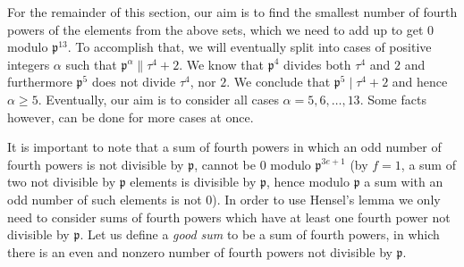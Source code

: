 \documentclass[12pt]{article}
\theoremstyle{remark}
\begin{document}
For the remainder of this section, our aim is to find the smallest number of fourth powers of the elements from the above sets, which we need to add up to get 0 modulo $\mathfrak{p}^{13}$. To accomplish that, we will eventually split into cases of positive integers $\alpha$ such that $\mathfrak{p}^{\alpha} \parallel \tau^4+2$. We know that $\mathfrak{p}^{4}$ divides both $\tau^4$ and $2$ and furthermore $\mathfrak{p}^{5}$ does not divide $\tau^4$, nor $2$. We conclude that $\mathfrak{p}^{5} \mid \tau^4 +2$ and hence $\alpha \geq 5$. Eventually, our aim is to consider all cases $\alpha =5,6,\dots, 13$. Some facts however, can be done for more cases at once.

It is important to note that a sum of fourth powers in which an odd number of fourth powers is not divisible by $\mathfrak{p}$, cannot be 0 modulo $\mathfrak{p}^{3e+1}$ (by $f=1$, a sum of two not divisible by $\mathfrak{p}$ elements is divisible by $\mathfrak{p}$, hence modulo $\mathfrak{p}$ a sum with an odd number of such elements is not 0). In order to use Hensel's lemma we only need to consider sums of fourth powers which have at least one fourth power not divisible by $\mathfrak{p}$. Let us define a \emph{good sum} to be a sum of fourth powers, in which there is an even and nonzero number of fourth powers not divisible by $\mathfrak{p}$.
 
\end{document}
